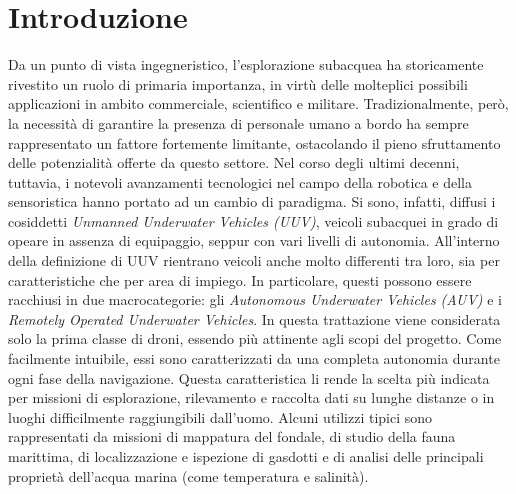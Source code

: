 
\chapter{Introduzione}

Da un punto di vista ingegneristico, l'esplorazione subacquea ha storicamente rivestito un ruolo di primaria importanza, in virtù delle molteplici possibili applicazioni in ambito commerciale, scientifico e militare. Tradizionalmente, però, la necessità di garantire la presenza di personale umano a bordo ha sempre rappresentato un fattore fortemente limitante, ostacolando il pieno sfruttamento delle potenzialità offerte da questo settore. Nel corso degli ultimi decenni, tuttavia, i notevoli avanzamenti tecnologici nel campo della robotica e della sensoristica hanno portato ad un cambio di paradigma. Si sono, infatti, diffusi i cosiddetti \emph{Unmanned Underwater Vehicles (UUV)}, veicoli subacquei in grado di opeare in assenza di equipaggio, seppur con vari livelli di autonomia. All'interno della definizione di UUV rientrano veicoli anche molto differenti tra loro, sia per caratteristiche che per area di impiego. In particolare, questi possono essere racchiusi in due macrocategorie: gli \emph{Autonomous Underwater Vehicles (AUV)} e i \emph{Remotely Operated Underwater Vehicles}. In questa trattazione viene considerata solo la prima classe di droni, essendo più attinente agli scopi del progetto. Come facilmente intuibile, essi sono caratterizzati da una completa autonomia durante ogni fase della navigazione. Questa caratteristica li rende la scelta più indicata per missioni di esplorazione, rilevamento e raccolta dati su lunghe distanze o in luoghi difficilmente raggiungibili dall'uomo. Alcuni utilizzi tipici sono rappresentati da missioni di mappatura del fondale, di studio della fauna marittima, di localizzazione e ispezione di gasdotti e di analisi delle principali proprietà dell'acqua marina (come temperatura e salinità). 

